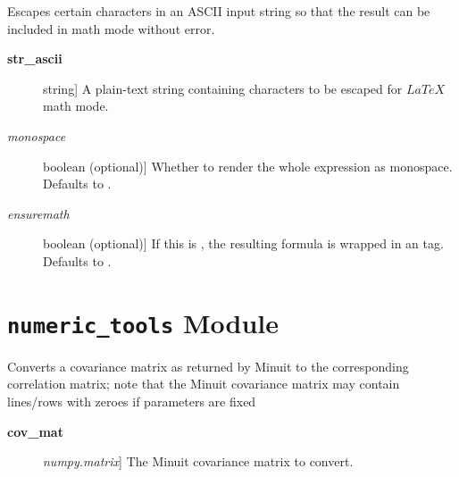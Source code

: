 \documentclass[a4paper,10pt,english]{sphinxmanual}
\begin{document}
\begin{fulllineitems}
\label{index:kafe.latex_tools.ascii_to_latex_math}
Escapes certain characters in an ASCII input string so that the result
can be included in math mode without error.
\begin{description}
\item[{\textbf{str\_ascii}}] \leavevmode{[}string{]}
A plain-text string containing characters to be escaped for
$LaTeX$ math mode.

\item[{\emph{monospace}}] \leavevmode{[}boolean (optional){]}
Whether to render the whole expression as monospace. Defaults to
.

\item[{\emph{ensuremath}}] \leavevmode{[}boolean (optional){]}
If this is , the resulting formula is wrapped in
an  tag. Defaults to .

\end{description}

\end{fulllineitems}



\section{\texttt{numeric\_tools} Module}
\label{index:module-kafe.numeric_tools}\label{index:numeric-tools-module}\label{index:module-numeric_tools}

\begin{fulllineitems}
\label{index:kafe.numeric_tools.MinuitCov_to_cor}
Converts a covariance matrix as returned by Minuit to the 
corresponding correlation matrix; note that the Minuit
covariance matrix may contain lines/rows with zeroes if
parameters are fixed
\begin{description}
\item[{\textbf{cov\_mat}}] \leavevmode{[}\emph{numpy.matrix}{]}
The Minuit covariance matrix to convert.

\end{description}

\end{fulllineitems}
\end{document}
